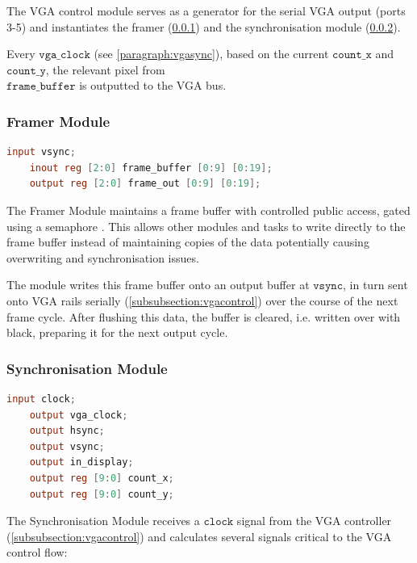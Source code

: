 The VGA control module serves as a generator for the serial VGA output 
(ports 3-5) and instantiates the framer (\ref{subsubsection:framer}) and
the synchronisation module (\ref{subsubsection:vgasync}).

Every \(\texttt{vga\_clock}\) (see \ref{paragraph:vgasync}), based on the
current \(\texttt{count\_x}\) and \(\texttt{count\_y}\), the relevant pixel from \\
\(\texttt{frame\_buffer}\) is outputted to the VGA bus.\\
 

\subsubsection{Framer Module}
\label{subsubsection:framer}
%
\begin{lstlisting}[language=Verilog]
    input vsync;
    inout reg [2:0] frame_buffer [0:9] [0:19];
    output reg [2:0] frame_out [0:9] [0:19];
\end{lstlisting}

The Framer Module maintains a frame buffer with controlled public access,
gated using a semaphore \cite{semaphore}. This allows other modules and tasks 
to write directly to the frame buffer instead of maintaining copies of the data 
potentially causing overwriting and synchronisation issues.

The module writes this frame buffer onto an output buffer at \(\texttt{vsync}\), 
in turn sent onto VGA rails serially (\ref{subsubsection:vgacontrol})
over the course of the next frame cycle. After flushing this data, the buffer is cleared,
i.e. written over with black, preparing it for the next output cycle.\\

\subsubsection{Synchronisation Module}
\label{subsubsection:vgasync}
%
\begin{lstlisting}[language=Verilog]
    input clock;
    output vga_clock;
    output hsync;              
    output vsync;               
    output in_display;          
    output reg [9:0] count_x;
    output reg [9:0] count_y;
\end{lstlisting}

The Synchronisation Module receives a \(\texttt{clock}\) signal from
the VGA controller (\ref{subsubsection:vgacontrol}) and calculates several
signals critical to the VGA control flow:

